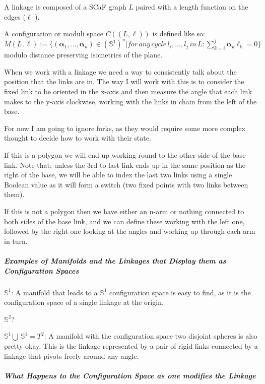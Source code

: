 \documentclass[
]{article}
\begin{document}
A linkage is composed of a SCaF graph \(L\) paired with a length
function on the edges (\(\ell\) ).

A configuration or moduli space \(C((L,\ell))\) is defined like so:\\
\( M(L,\ell) := \{(\boldsymbol\alpha_1,..., \boldsymbol\alpha_n) \in (\mathbb S^1)^n | for \, any \, cycle \, l_i, ..., l_j\, in \, L: \sum_{k=i}^j \boldsymbol\alpha_k \ell_k = 0 \}\)\\
modulo distance preserving isometries of the plane.

When we work with a linkage we need a way to consistently talk about the
position that the links are in. The way I will work with this is to
consider the fixed link to be oriented in the x-axis and then measure
the angle that each link makes to the y-axis clockwise, working with the
links in chain from the left of the base.

For now I am going to ignore forks, as they would require some more
complex thought to decide how to work with their state.

If this is a polygon we will end up working round to the other side of
the base link. Note that; unless the 3rd to last link ends up in the
same position as the right of the base, we will be able to index the
last two links using a single Boolean value as it will form a switch
(two fixed points with two links between them).

If this is not a polygon then we have either an n-arm or nothing
connected to both sides of the base link, and we can define these
working with the left one, followed by the right one looking at the
angles and working up through each arm in turn.

\hypertarget{header-n96}{%
\subparagraph{\texorpdfstring{\emph{Examples of Manifolds and the
Linkages that Display them as Configuration
Spaces}}{Examples of Manifolds and the Linkages that Display them as Configuration Spaces}}\label{header-n96}}

\(\mathbb S^1 \): A manifold that leads to a \(\mathbb S^1\)
configuration space is easy to find, as it is the configuration space of
a single linkage at the origin.

\(\mathbb S^2\)?

\(\mathbb S^1 \bigcup \, \mathbb S^1 = T^2\): A manifold with the
configuration space two disjoint spheres is also pretty okay. This is
the linkage represented by a pair of rigid links connected by a linkage
that pivots freely around any angle.

\hypertarget{header-n100}{%
\subparagraph{\texorpdfstring{\emph{What Happens to the Configuration
Space as one modifies the Linkage}
}{What Happens to the Configuration Space as one modifies the Linkage }}\label{header-n100}}
\end{document}
